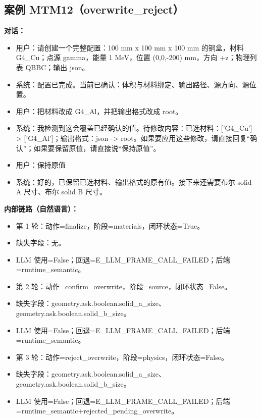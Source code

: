 \documentclass[11pt]{ctexart}
\begin{document}
\subsection{案例 MTM12（overwrite\_reject）}
\textbf{对话：}
\begin{itemize}
\item 用户：请创建一个完整配置：100 mm x 100 mm x 100 mm 的铜盒，材料 G4\_Cu；点源 gamma，能量 1 MeV，位置 (0,0,-200) mm，方向 +z；物理列表 QBBC；输出 json。
\item 系统：配置已完成。当前已确认：体积与材料绑定、输出路径、源方向、源位置。
\item 用户：把材料改成 G4\_Al，并把输出格式改成 root。
\item 系统：我检测到这会覆盖已经确认的值。待修改内容：已选材料：['G4\_Cu'] -> ['G4\_Al']；输出格式：json -> root。如果要应用这些修改，请直接回复“确认”；如果要保留原值，请直接说“保持原值”。
\item 用户：保持原值
\item 系统：好的，已保留已选材料、输出格式的原有值。接下来还需要布尔 solid A 尺寸、布尔 solid B 尺寸。
\end{itemize}
\textbf{内部链路（自然语言）：}
\begin{itemize}
\item 第 1 轮：动作=finalize，阶段=materials，闭环状态=True。
\item 缺失字段：无。
\item LLM 使用=False；回退=E\_LLM\_FRAME\_CALL\_FAILED；后端=runtime\_semantic。
\item 第 2 轮：动作=confirm\_overwrite，阶段=source，闭环状态=False。
\item 缺失字段：geometry.ask.boolean.solid\_a\_size、geometry.ask.boolean.solid\_b\_size。
\item LLM 使用=False；回退=E\_LLM\_FRAME\_CALL\_FAILED；后端=runtime\_semantic。
\item 第 3 轮：动作=reject\_overwrite，阶段=physics，闭环状态=False。
\item 缺失字段：geometry.ask.boolean.solid\_a\_size、geometry.ask.boolean.solid\_b\_size。
\item LLM 使用=False；回退=E\_LLM\_FRAME\_CALL\_FAILED；后端=runtime\_semantic+rejected\_pending\_overwrite。
\end{itemize}
\end{document}
